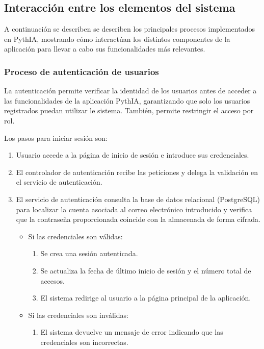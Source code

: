 \subsection{Interacción entre los elementos del sistema}

A continuación se describen se describen los principales procesos implementados en PythIA, mostrando cómo interactúan los distintos componentes de la aplicación para llevar a cabo sus funcionalidades más relevantes.

\subsubsection{Proceso de autenticación de usuarios}

La autenticación permite verificar la identidad de los usuarios antes de acceder a las funcionalidades de la aplicación PythIA, garantizando que solo los usuarios registrados puedan utilizar le sistema. También, permite restringir el acceso por rol.

Los pasos para iniciar sesión son:
\begin{enumerate}
	\item Usuario accede a la página de inicio de sesión e introduce sus credenciales. 
	\item El controlador de autenticación recibe las peticiones y delega la validación en el servicio de autenticación.
	\item El servicio de autenticación consulta la base de datos relacional (PostgreSQL) para localizar la cuenta asociada al correo electrónico introducido y verifica que la contraseña proporcionada coincide con la almacenada de forma cifrada.
	\begin{itemize}
		\item Si las credenciales son válidas:
		\begin{enumerate}
			\item Se crea una sesión autenticada.
			\item Se actualiza la fecha de último inicio de sesión y el número total de accesos.
			\item El sistema redirige al usuario a la página principal de la aplicación.
		\end{enumerate} 
		\item Si las credenciales son inválidas:
		\begin{enumerate}
			\item El sistema devuelve un mensaje de error indicando que las credenciales son incorrectas.
		\end{enumerate}
	\end{itemize}
\end{enumerate}

